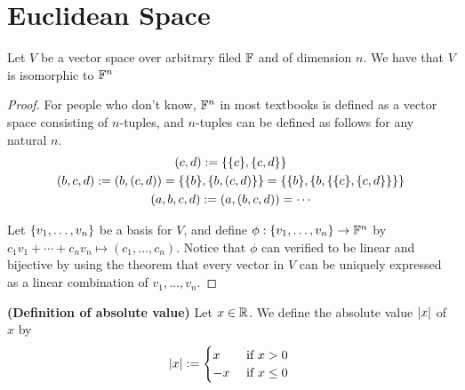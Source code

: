 \documentclass{report}
\begin{document}
\section{Euclidean Space}
\begin{theorem}
\label{1.5.1}
Let $V$ be a vector space over arbitrary filed $\mathbb{F}$ and of dimension $n$. We have that  $V$ is isomorphic to  $\mathbb{F}^n$  
\end{theorem}
\begin{proof}
For people who don't know, $\mathbb{F}^n$ in most textbooks is defined as a vector space consisting of $n$-tuples, and $n$-tuples can be defined as follows for any natural $n$.\\

 \begin{gather}
   (c,d):=\{ \{ c \},\{ c,d \} \}\\
   (b,c,d):=(b,(c,d))=\{ \{ b \},\{ b,(c,d) \} \}=\{ \{ b \},\{ b,\{ \{ c \},\{ c,d \} \} \} \}\\
   (a,b,c,d):=(a,(b,c,d))=\cdots 
\end{gather}


  Let $\{ v_1,\dots,v_n \}$ be a basis for $V$, and define $\phi: \{ v_1,\dots ,v_n \} \rightarrow \mathbb{F}^n$ by $c_1v_1+\cdots+c_nv_n\mapsto (c_1,\dots,c_n)$. Notice that $\phi$ can verified to be linear and bijective by using the theorem that every vector in $V$ can be uniquely expressed as a linear combination of  $v_1,\dots ,v_n$.  
\end{proof}
\begin{definition}
\label{1.5.2}
\textbf{(Definition of absolute value)} Let $x\in\mathbb{R}$. We define the absolute value $|x|$ of $x$ by
\begin{equation}
|x|:=\begin{cases}
  x & \text{ if $x>0$ }\\
  -x& \text{ if $x\leq 0$  }
\end{cases} 
\end{equation}
\end{definition}
\end{document}
